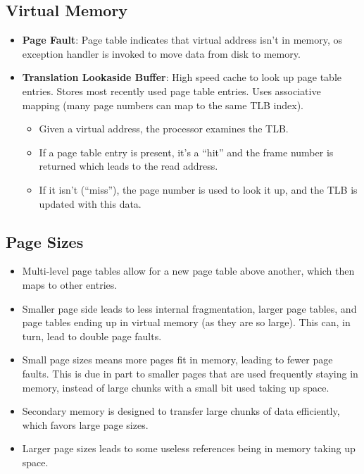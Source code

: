 \documentclass[fontsize=4.5pt]{scrartcl}
\begin{document}
\begin{multicols}{3}
    \section{Virtual Memory}
      \begin{itemize}
       \item \textbf{Page Fault}: Page table indicates that virtual address isn't in memory, os exception handler is invoked to move data from disk to memory.
       \item \textbf{Translation Lookaside Buffer}: High speed cache to look up page table entries. Stores most recently used page table entries. Uses associative mapping (many page
              numbers can map to the same TLB index).
       \begin{itemize}
          \item Given a virtual address, the processor examines the TLB.
          \item If a page table entry is present, it's a ``hit'' and the frame number is returned which leads to the read address.
          \item If it isn't (``miss''), the page number is used to look it up, and the TLB is updated with this data.
       \end{itemize}
      \end{itemize}
      \subsection{Page Sizes}
      \begin{itemize}
       \item Multi-level page tables allow for a new page table above another, which then maps to other entries. 
       \item Smaller page side leads to less internal fragmentation, larger page tables, and page tables ending up in virtual memory (as they are so large). This can, in turn, lead to double page faults.
       \item Small page sizes means more pages fit in memory, leading to fewer page faults. This is due in part to smaller pages that are used frequently staying in memory, instead of large chunks with a small bit
             used taking up space.
       \item Secondary memory is designed to transfer large chunks of data efficiently, which favors large page sizes.
       \item Larger page sizes leads to some useless references being in memory taking up space.
      \end{itemize}

\end{multicols}
\end{document}
